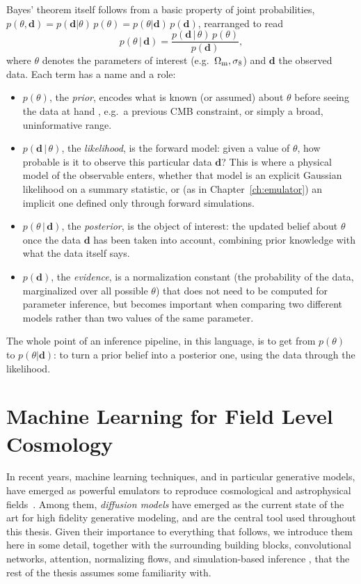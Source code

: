 Bayes' theorem itself follows from a basic property of joint probabilities, $p(\theta,\bm{d}) = p(\bm{d}|\theta)\,p(\theta) = p(\theta|\bm{d})\,p(\bm{d})$, rearranged to read
\begin{equation}
    p(\theta\,|\,\bm{d}) = \frac{p(\bm{d}\,|\,\theta)\,p(\theta)}{p(\bm{d})},
\end{equation}
where $\theta$ denotes the parameters of interest (e.g.\ $\Omega_\mathrm{m},\sigma_8$) and $\bm{d}$ the observed data. Each term has a name and a role:
\begin{itemize}
    \item $p(\theta)$, the \emph{prior}, encodes what is known (or assumed) about $\theta$ before seeing the data at hand , e.g.\ a previous CMB constraint, or simply a broad, uninformative range.
    \item $p(\bm{d}\,|\,\theta)$, the \emph{likelihood}, is the forward model: given a value of $\theta$, how probable is it to observe this particular data $\bm{d}$? This is where a physical model of the observable enters, whether that model is an explicit Gaussian likelihood on a summary statistic, or (as in Chapter~\ref{ch:emulator}) an implicit one defined only through forward simulations.
    \item $p(\theta\,|\,\bm{d})$, the \emph{posterior}, is the object of interest: the updated belief about $\theta$ once the data $\bm{d}$ has been taken into account, combining prior knowledge with what the data itself says.
    \item $p(\bm{d})$, the \emph{evidence}, is a normalization constant (the probability of the data, marginalized over all possible $\theta$) that does not need to be computed for parameter inference, but becomes important when comparing two different models rather than two values of the same parameter.
\end{itemize}

The whole point of an inference pipeline, in this language, is to get from $p(\theta)$ to $p(\theta|\bm{d})$: to turn a prior belief into a posterior one, using the data through the likelihood. 

\section{Machine Learning for Field Level Cosmology}
\label{sec:ml_field_level}

In recent years, machine learning techniques, and in particular generative models, have emerged as powerful emulators to reproduce cosmological and astrophysical fields~\citep{perraudin2019cosmologicalnbodysimulationschallenge,Li_2021,jamieson_field-level_2023,Rigo_2025,hassan_hiflow_2022,andrianomena_emulating_2022,sharma25,bernardini2025ember2,andrianomena2024cosmologicalmultifieldemulator}. Among them, \emph{diffusion models} have emerged as the current state of the art for high fidelity generative modeling, and are the central tool used throughout this thesis. Given their importance to everything that follows, we introduce them here in some detail, together with the surrounding building blocks, convolutional networks, attention, normalizing flows, and simulation-based inference , that the rest of the thesis assumes some familiarity with.

